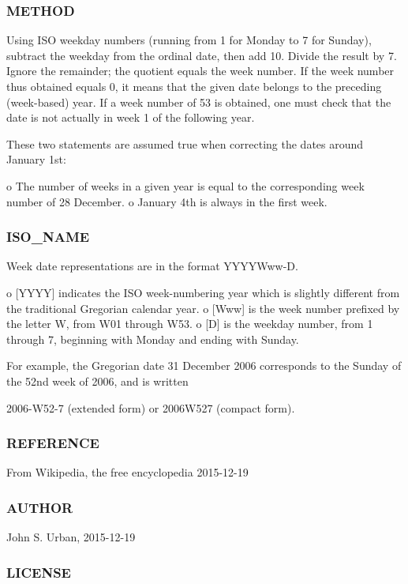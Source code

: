 \subsubsection*{M\+E\+T\+H\+OD}

Using I\+SO weekday numbers (running from 1 for Monday to 7 for Sunday), subtract the weekday from the ordinal date, then add 10. Divide the result by 7. Ignore the remainder; the quotient equals the week number. If the week number thus obtained equals 0, it means that the given date belongs to the preceding (week-\/based) year. If a week number of 53 is obtained, one must check that the date is not actually in week 1 of the following year.

These two statements are assumed true when correcting the dates around January 1st\+:

o The number of weeks in a given year is equal to the corresponding week number of 28 December. o January 4th is always in the first week.

\subsubsection*{I\+S\+O\+\_\+\+N\+A\+ME}

Week date representations are in the format Y\+Y\+Y\+Y\+Www-\/D.

o \mbox{[}Y\+Y\+YY\mbox{]} indicates the I\+SO week-\/numbering year which is slightly different from the traditional Gregorian calendar year. o \mbox{[}Www\mbox{]} is the week number prefixed by the letter W, from W01 through W53. o \mbox{[}D\mbox{]} is the weekday number, from 1 through 7, beginning with Monday and ending with Sunday.

For example, the Gregorian date 31 December 2006 corresponds to the Sunday of the 52nd week of 2006, and is written

2006-\/\+W52-\/7 (extended form) or 2006\+W527 (compact form).

\subsubsection*{R\+E\+F\+E\+R\+E\+N\+CE}

From Wikipedia, the free encyclopedia 2015-\/12-\/19

\subsubsection*{A\+U\+T\+H\+OR}

John S. Urban, 2015-\/12-\/19 \subsubsection*{L\+I\+C\+E\+N\+SE}

